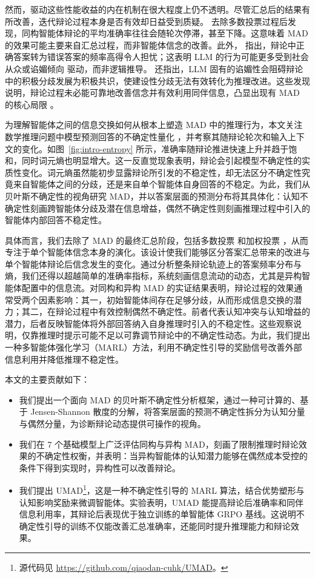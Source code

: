 \documentclass{article}
\theoremstyle{plain}
\theoremstyle{definition}
\theoremstyle{remark}
\begin{document}
然而，驱动这些性能收益的内在机制在很大程度上仍不透明。尽管汇总后的结果有所改善，迭代辩论过程本身是否有效却日益受到质疑。\citet{choi2025debate} 去除多数投票过程后发现，同构智能体辩论的平均准确率往往会随轮次停滞，甚至下降。这意味着 MAD 的效果可能主要来自汇总过程，而非智能体信念的改善。此外，\citet{wynn2025talk} 指出，辩论中正确答案转为错误答案的频率高得令人担忧；这表明 LLM 的行为可能更多受到社会从众或谄媚倾向 \cite{sharma2024sycophancy} 驱动，而非逻辑推导。\citet{yao2025peacemaker} 还指出，LLM 固有的谄媚性会阻碍辩论中的积极分歧发展为积极共识，使建设性分歧无法有效转化为推理改进。这些发现说明，辩论过程未必能可靠地改善信念并有效利用同伴信息，凸显出现有 MAD 的核心局限 \cite{wang2024rethinking}。


为理解智能体之间的信息交换如何从根本上塑造 MAD 中的推理行为，本文关注数学推理问题中模型预测回答的不确定性量化 \cite{lakshminarayanan2017simple}，并考察其随辩论轮次和输入上下文的变化。如图~\ref{fig:intro-entropy} 所示，准确率随辩论推进快速上升并趋于饱和，同时词元熵也明显增大。这一反直觉现象表明，辩论会引起模型不确定性的实质性变化。词元熵虽然能初步显露辩论所引发的不稳定性，却无法区分不确定性究竟来自智能体之间的分歧，还是来自单个智能体自身回答的不稳定。为此，我们从贝叶斯不确定性的视角研究 MAD，并以答案层面的预测分布将其具体化：认知不确定性刻画跨智能体分歧及潜在信息增益，偶然不确定性则刻画推理过程中引入的智能体内部回答不稳定性。

具体而言，我们去除了 MAD 的最终汇总阶段，包括多数投票 \cite{du2023improving} 和加权投票 \cite{chen2024reconcile}，从而专注于单个智能体信念本身的演化。该设计使我们能够区分答案汇总带来的改进与单个智能体辩论后信念发生的变化。通过分析整条辩论轨迹上的答案频率分布与熵，我们还得以超越简单的准确率指标，系统刻画信息流动的动态，尤其是异构智能体配置中的信息流。对同构和异构 MAD 的实证结果表明，辩论过程的效果通常受两个因素影响：其一，初始智能体间存在足够分歧，从而形成信息交换的潜力；其二，在辩论过程中有效控制偶然不确定性。前者代表认知冲突与认知增益的潜力，后者反映智能体将外部回答纳入自身推理时引入的不稳定性。这些观察说明，仅靠推理时提示可能不足以可靠调节辩论中的不确定性动态。为此，我们提出一种多智能体强化学习（MARL）方法，利用不确定性引导的奖励信号改善外部信息利用并降低推理不稳定性。

本文的主要贡献如下：
\begin{itemize}
\item 我们提出一个面向 MAD 的贝叶斯不确定性分析框架，通过一种可计算的、基于 Jensen-Shannon 散度的分解，将答案层面的预测不确定性拆分为认知分量与偶然分量，为诊断辩论动态提供可操作的视角。
\item 我们在 7 个基础模型上广泛评估同构与异构 MAD，刻画了限制推理时辩论效果的不确定性权衡，并表明：当异构智能体的认知潜力能够在偶然成本受控的条件下得到实现时，异构性可以改善辩论。
\item 我们提出 UMAD\footnote{源代码见 \url{https://github.com/qiaodan-cuhk/UMAD}。}，这是一种不确定性引导的 MARL 算法，结合优势塑形与认知影响奖励来微调智能体。实验表明，UMAD 能提高辩论后准确率和同伴信息利用率，其辩论后表现优于独立训练的单智能体 GRPO 基线。这说明不确定性引导的训练不仅能改善汇总准确率，还能同时提升推理能力和辩论效果。
\end{itemize}
\end{document}
